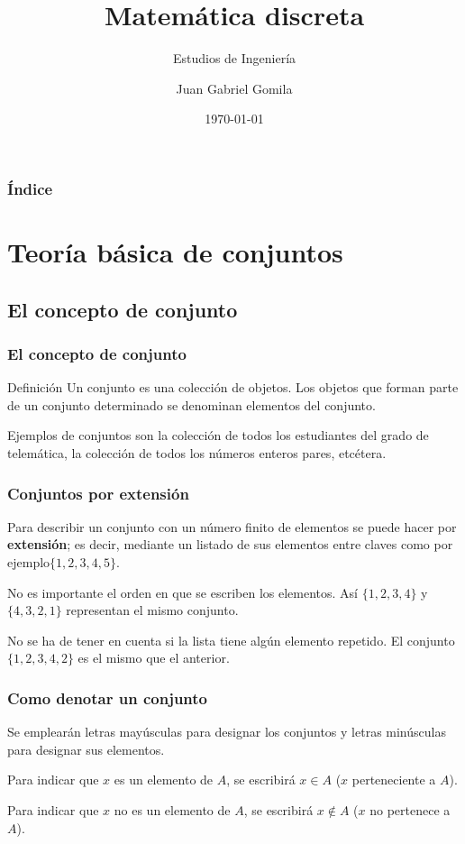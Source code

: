 \documentclass{beamer}
\title[Tema 7 - Introducci\'on a la matem\'atica discreta]{Matem\'atica discreta}
\subtitle{Estudios de Ingenier\'ia}
\author[https://frogames.es]{
Juan Gabriel Gomila%
}
\institute[Frogames]{
 Frogames
   \and
  \texttt{https://frogames.es}
}
\date{\today}
\begin{document}
 

\frame{\titlepage}

\begin{frame}
  \frametitle{\'Indice}
  \tableofcontents
\end{frame}

\section{Teor\'ia b\'asica de conjuntos}
\subsection{El concepto de conjunto}
\begin{frame}
\frametitle{El concepto de conjunto}
\begin{block}{Definici\'on}
Un conjunto es una colecci\'on de objetos. Los objetos que forman parte de un conjunto determinado se denominan elementos del conjunto.
\end{block}


Ejemplos de conjuntos son la colecci\'on de todos los estudiantes del grado de telem\'atica, la colecci\'on de todos los n\'umeros enteros pares, etc\'etera.
\end{frame}



\begin{frame}
\frametitle{Conjuntos por extensi\'on}
Para describir un conjunto con un n\'umero finito de elementos se puede hacer por \textbf{extensi\'on}; es decir, mediante un listado de sus elementos entre claves como por ejemplo$\{1,2,3,4,5\}$.

No es importante el orden en que se escriben los elementos. As\'i $\{1, 2, 3, 4\}$ y $\{4, 3, 2, 1\}$ representan el mismo conjunto.


No se ha de tener en cuenta si la lista tiene alg\'un elemento repetido. El conjunto $\{1, 2, 3, 4, 2\}$ es el mismo que el anterior.
\end{frame}


\begin{frame}
\frametitle{Como denotar un conjunto}
Se emplear\'an letras may\'usculas para designar los conjuntos y letras min\'usculas para designar sus elementos.

Para indicar que $x$ es un elemento de $A$, se escribir\'a $x\in A$ ($x$ perteneciente a $A$).

Para indicar que $x$ no es un elemento de $A$, se escribir\'a $x\notin A$ ($x$ no pertenece a $A$).
\end{frame}
\end{document}
